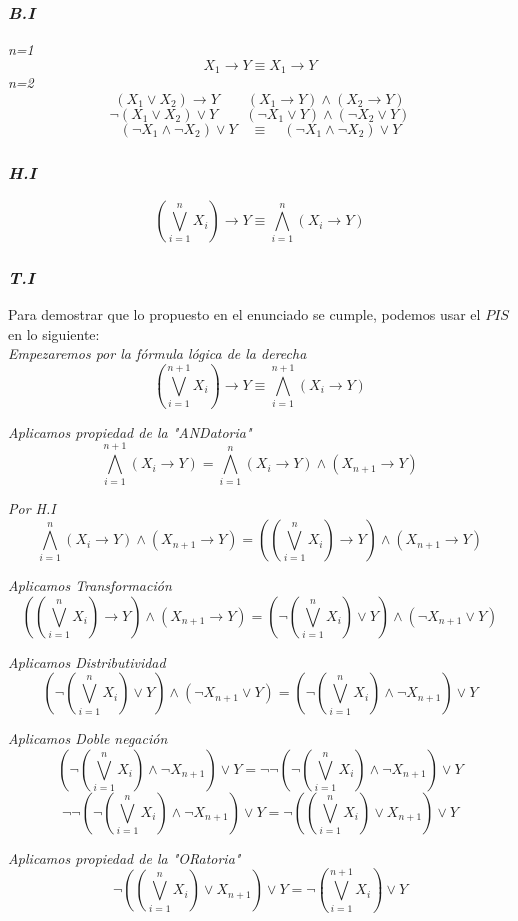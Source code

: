 \documentclass{article}
\begin{document}
\subsubsection*{\emph{B.I}}
\emph{n=1}
\[X_1 \rightarrow Y \equiv X_1 \rightarrow Y\]
\emph{n=2}
\[(X_1 \lor X_2) \rightarrow Y \qquad (X_1 \rightarrow Y) \land (X_2 \rightarrow Y) \]
\[\neg(X_1 \lor X_2) \lor Y \qquad (\neg X_1 \lor Y) \land (\neg X_2 \lor Y) \]
\[(\neg X_1 \land \neg X_2) \lor Y \quad \equiv \quad (\neg X_1 \land \neg X_2) \lor Y \]

\subsubsection*{\emph{H.I}}
\[ (\bigvee _{i=1}^{n} X_i) \rightarrow Y \equiv \bigwedge _{i=1}^{n} (X_i \rightarrow Y) \]

\subsubsection*{\emph{T.I}}
Para demostrar que lo propuesto en el enunciado se cumple, podemos usar el $PIS$ en lo siguiente:\\
\emph{Empezaremos por la fórmula lógica de la derecha}
\[ (\bigvee _{i=1}^{n+1} X_i) \rightarrow Y \equiv \bigwedge _{i=1}^{n+1} (X_i \rightarrow Y) \]

\emph{Aplicamos propiedad de la "ANDatoria"}
\[ \bigwedge _{i=1}^{n+1} (X_i \rightarrow Y) = \bigwedge _{i=1}^{n} (X_i \rightarrow Y) \land (X_{n+1} \rightarrow Y) \]

\emph{Por H.I}
\[ \bigwedge _{i=1}^{n} (X_i \rightarrow Y) \land (X_{n+1} \rightarrow Y) = ((\bigvee _{i=1}^{n} X_i) \rightarrow Y) \land (X_{n+1} \rightarrow Y) \] 

\emph{Aplicamos Transformación}
\[ ((\bigvee _{i=1}^{n} X_i) \rightarrow Y) \land (X_{n+1} \rightarrow Y) = (\neg(\bigvee _{i=1}^{n} X_i) \lor Y) \land (\neg X_{n+1} \lor Y) \]

\emph{Aplicamos Distributividad}
\[ (\neg(\bigvee _{i=1}^{n} X_i) \lor Y) \land (\neg X_{n+1} \lor Y) = (\neg(\bigvee _{i=1}^{n} X_i) \land \neg X_{n+1} ) \lor Y\]

\emph{Aplicamos Doble negación}
\[ (\neg(\bigvee _{i=1}^{n} X_i) \land \neg X_{n+1} ) \lor Y = \neg\neg(\neg(\bigvee _{i=1}^{n} X_i) \land \neg X_{n+1} ) \lor Y\] 
\[ \neg\neg(\neg(\bigvee _{i=1}^{n} X_i) \land \neg X_{n+1} ) \lor Y = \neg((\bigvee _{i=1}^{n} X_i) \lor  X_{n+1} )\lor Y \]

\emph{Aplicamos propiedad de la "ORatoria"}
\[ \neg((\bigvee _{i=1}^{n} X_i) \lor  X_{n+1}) \lor Y = \neg(\bigvee _{i=1}^{n+1} X_i) \lor Y \]
\end{document}
